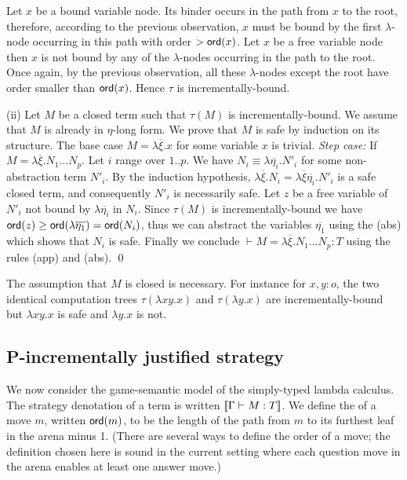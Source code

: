 Let $x$ be a bound variable node. Its binder occurs in the path from
$x$ to the root, therefore, according to the previous observation, $x$
must be bound by the first $\lambda$-node occurring in this path with
order $>{\sf ord}(x)$. Let $x$ be a free variable node then $x$ is not
bound by any of the $\lambda$-nodes occurring in the path to the
root. Once again, by the previous observation, all these
$\lambda$-nodes except the root have order smaller than
${\sf ord}(x)$. Hence $\tau$ is incrementally-bound.

(ii) Let $M$ be a closed term such that $\tau(M)$ is
incrementally-bound.  We assume that $M$ is already in $\eta$-long
form.  We prove that $M$ is safe by induction on its structure. The
base case $M = \lambda \overline{\xi} . x$ for some variable $x$ is
trivial.  \emph{Step case:} If $M = \lambda \overline{\xi} . N_1
\ldots N_p$.  Let $i$ range over $1..p$. We have $N_i \equiv \lambda
\overline{\eta_i} . N'_i$ for some non-abstraction term $N'_i$. By the induction hypothesis, $\lambda \overline{\xi} . N_i = \lambda \overline{\xi} \overline{\eta_i} . N'_i$ is a safe closed term, and consequently $N'_i$ is necessarily safe. Let $z$ be a free variable
of $N'_i$ not bound by $\lambda \overline{\eta_i}$ in $N_i$. Since
$\tau(M)$ is incrementally-bound we have ${\sf ord}(z) \geq {\sf ord}(\lambda
  \overline{\eta_1}) = {\sf ord}(N_i)$, thus we can abstract the variables $\overline{\eta_1}$ using the {\sf (abs)} which shows that $N_i$ is safe.  Finally
we conclude $\vdash M = \lambda \overline{\xi} . N_1 \ldots N_p : T$ using
the rules {\sf (app)} and {\sf (abs)}.  \qed



The assumption that $M$ is closed is necessary. For instance for
$x,y:o$, the two identical computation trees $\tau(\lambda x y .x)$
and $\tau(\lambda y . x)$ are
incrementally-bound but $\lambda x y .x$ is safe and $\lambda y . x$
is not.

\subsection*{P-incrementally justified strategy}

We now consider the game-semantic model of the simply-typed lambda
calculus. The strategy denotation of a term is written ${[\![ \Gamma \vdash M : T ]\!]}$. We define the  of a move $m$, written ${\sf ord}(m)$, to be the length of the path from $m$ to its furthest leaf in the arena minus 1. (There are several ways to define the order of a move; the definition chosen here is sound in the current setting where each question move in the arena enables at least one answer move.)

